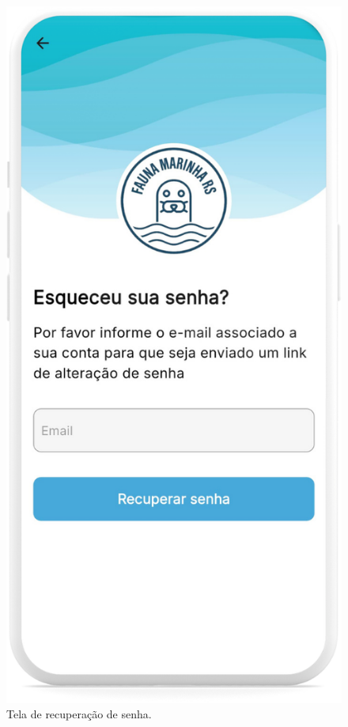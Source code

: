 \begin{figure}[H]
        \centering
        \includegraphics[height=0.72\textheight]{imagens/sistema/device_frame/recuperarSenha.png}
        \caption{Tela de recuperação de senha.}
        \label{fig:esqueci-senha}
\end{figure}

